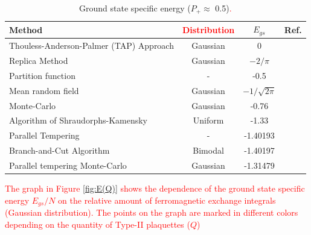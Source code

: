 \documentclass[preprint,12pt]{elsarticle}
\begin{document}
	\begin{table}[h]
		\begin{tabular}{|l|c|c|l|}
			\hline
			Method     &     \textcolor{red}{Distribution}                         &
			$E_{gs}$                                       &  Ref.                                          \\ \hline
			Thouless-Anderson-Palmer (TAP) Approach& Gaussian &  0                                              & \cite{thouless1977solution}    \\ \hline
			Replica Method   & Gaussian                         & $-2/\pi$                                       & \cite{sherrington1975solvable} \\ \hline
			Partition function   &   -                 & -0.5                                           & \cite{tanaka1980analytic}      \\ \hline
			Mean random field  &   Gaussian  &                   $-1/\sqrt{2\pi}$                               & \cite{klein1976comparison}     \\ \hline
			Monte-Carlo      &   Gaussian    &        -0.76                                          & \cite{kirkpatrick1978infinite} \\ \hline
			Algorithm of Shraudorphs-Kamensky   &  Uniform &     -1.33                                          & \cite{karandashev2019global}   \\ \hline
			Parallel Tempering &   -       & -1.40193                                       & \cite{palmer1999ground}        \\ \hline
			Branch-and-Cut Algorithm  & Bimodal               & -1.40197                         
			& \cite{campbell2004energy}      \\ \hline
			
			Parallel tempering Monte-Carlo    &  Gaussian         & -1.31479                                       & \cite{roma2009ground}          \\ \hline
			
			
			
		\end{tabular}
		\caption{Ground state specific energy ($P_+\approx$ 0.5)\textcolor{red}{.}}
		\label{tab:Egs}
	\end{table}
	\textcolor{red}{
		The graph in Figure \ref{fig:E(Q)} shows the dependence of the ground state specific energy $E_{gs}/N$ on the relative amount of ferromagnetic exchange integrals (Gaussian distribution). The points on the graph are marked in different colors depending on the quantity of Type-II plaquettes ($Q$)}
	
\end{document}

